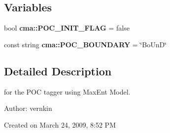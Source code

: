 \subsection*{Variables}
\begin{CompactItemize}
\item 
bool \textbf{cma::POC\_\-INIT\_\-FLAG} = false\label{namespacecma_835f0d6dd48a8037cf3d4a5a415a7323}

\item 
const string \textbf{cma::POC\_\-BOUNDARY} = \char`\"{}BoUnD\char`\"{}\label{namespacecma_6a315ae82b1eb14e31c1c281af3b041c}

\end{CompactItemize}


\subsection{Detailed Description}
for the POC tagger using MaxEnt Model. 

\begin{Desc}
\item[Author:]vernkin\end{Desc}
Created on March 24, 2009, 8:52 PM 
